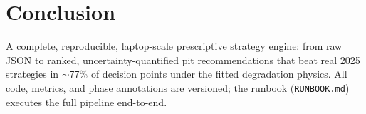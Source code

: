 \documentclass[11pt]{article}
\begin{document}
\section{Conclusion}
A complete, reproducible, laptop-scale prescriptive strategy engine: from raw
JSON to ranked, uncertainty-quantified pit recommendations that beat real
2025 strategies in $\sim$77\% of decision points under the fitted
degradation physics. All code, metrics, and phase annotations are versioned;
the runbook (\texttt{RUNBOOK.md}) executes the full pipeline end-to-end.
\end{document}
